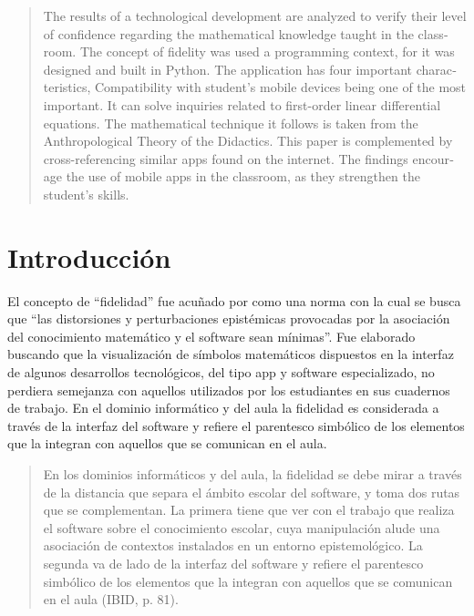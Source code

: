 \documentclass[spanish]{textolivre}
\begin{document}
\begin{polyabstract}
\begin{english}
\begin{abstract}
The results of a technological development are analyzed to verify their level of confidence regarding the mathematical knowledge taught in the classroom. The concept of fidelity was used a programming context, for it was designed and built in Python. The application has four important characteristics, Compatibility with student’s mobile devices being one of the most important. It can solve inquiries related to first-order linear differential equations. The mathematical technique it follows is taken from the Anthropological Theory of the Didactics. This paper is complemented by cross-referencing similar apps found on the internet. The findings encourage the use of mobile apps in the classroom, as they strengthen the student’s skills.

\end{abstract}
\end{english}

\end{polyabstract}


\section{Introducción}\label{sec-intro}
El concepto de “fidelidad” fue acuñado por \textcite{camachorios2019} como una norma con la cual se busca que “las distorsiones y perturbaciones epistémicas provocadas por la asociación del conocimiento matemático y el software sean mínimas”. Fue elaborado buscando que la visualización de símbolos matemáticos dispuestos en la interfaz de algunos desarrollos tecnológicos, del tipo app y software especializado, no perdiera semejanza con aquellos utilizados por los estudiantes en sus cuadernos de trabajo. En el dominio informático y del aula la fidelidad es considerada a través de la interfaz del software y refiere el parentesco simbólico de los elementos que la integran con aquellos que se comunican en el aula.

\begin{quote}
En los dominios informáticos y del aula, la fidelidad se debe mirar a través de la distancia que separa el ámbito escolar del software, y toma dos rutas que se complementan. La primera tiene que ver con el trabajo que realiza el software sobre el conocimiento escolar, cuya manipulación alude una asociación de contextos instalados en un entorno epistemológico. La segunda va de lado de la interfaz del software y refiere el parentesco simbólico de los elementos que la integran con aquellos que se comunican en el aula (IBID, p. 81).
\end{quote}
\end{document}
